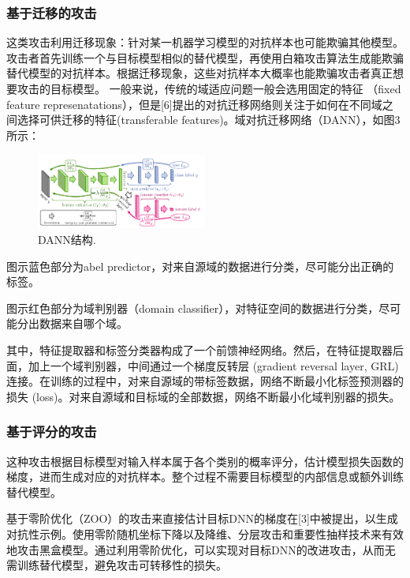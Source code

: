 \documentclass[twocolumn]{ctexart}
\renewcommand*{\songti}{\CJKfamily{zhsong}}%
\begin{document}
	\subsubsection{{\songti 基于迁移的攻击}\vspace{-0.6em}}
	这类攻击利用迁移现象：针对某一机器学习模型的对抗样本也可能欺骗其他模型。攻击者首先训练一个与目标模型相似的替代模型，再使用白箱攻击算法生成能欺骗替代模型的对抗样本。根据迁移现象，这些对抗样本大概率也能欺骗攻击者真正想要攻击的目标模型。
	一般来说，传统的域适应问题一般会选用固定的特征 （fixed feature represenatations），但是[6]提出的对抗迁移网络则关注于如何在不同域之间选择可供迁移的特征(transferable features)。域对抗迁移网络（DANN），如图3所示：
	\begin{figure}[htbp]
		\centering
		\includegraphics[width=0.5\textwidth]{fig3.png}
		\caption{DANN结构.}
		\label{fig}
	\end{figure}
	
	图示蓝色部分为abel predictor，对来自源域的数据进行分类，尽可能分出正确的标签。
	
	图示红色部分为域判别器（domain classifier），对特征空间的数据进行分类，尽可能分出数据来自哪个域。
	
	其中，特征提取器和标签分类器构成了一个前馈神经网络。然后，在特征提取器后面，加上一个域判别器，中间通过一个梯度反转层 (gradient reversal layer, GRL) 连接。在训练的过程中，对来自源域的带标签数据，网络不断最小化标签预测器的损失 (loss)。对来自源域和目标域的全部数据，网络不断最小化域判别器的损失。
	
	\subsubsection{{\songti 基于评分的攻击}\vspace{-0.6em}}
	这种攻击根据目标模型对输入样本属于各个类别的概率评分，估计模型损失函数的梯度，进而生成对应的对抗样本。整个过程不需要目标模型的内部信息或额外训练替代模型。
	
	基于零阶优化（ZOO）的攻击来直接估计目标DNN的梯度在[3]中被提出，以生成对抗性示例。使用零阶随机坐标下降以及降维、分层攻击和重要性抽样技术来有效地攻击黑盒模型。通过利用零阶优化，可以实现对目标DNN的改进攻击，从而无需训练替代模型，避免攻击可转移性的损失。
	
\end{document}
